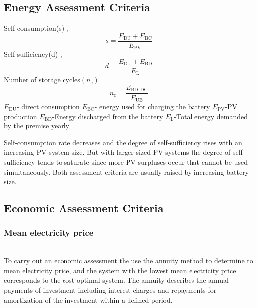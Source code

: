 \documentclass[sigconf,12pt,nonacm]{acmart}
\begin{document}
\subsection{Energy Assessment Criteria}
Self consumption(s) \cite{butzner_2017_der}, \cite{weniger_2014_sizing}
\begin{equation}\label{eq:1}s=\frac{E_{\mathrm{DU}}+E_{\mathrm{BC}}}{E_{\mathrm{PV}}}\end{equation}
Self sufficiency(d) \cite{butzner_2017_der}, \cite{weniger_2014_sizing}
\begin{equation}\label{eq:2}d=\frac{E_{\mathrm{DU}}+E_{\mathrm{BD}}}{E_{\mathrm{L}}}\end{equation}
Number of storage cycles$(n_{\mathrm{c}})$ \cite{weniger_2014_sizing}
\begin{equation}n_{\mathrm{c}}=\frac{E_{\mathrm{BD}, \mathrm{DC}}}{E_{\mathrm{UB}}}\end{equation}
$E_{\mathrm{DU}}$- direct consumption \newline
$E_{\mathrm{BC}}$- energy used  for  charging the battery \newline
$E_{\mathrm{PV}}$-PV production \newline
$E_{\mathrm{BD}}$-Energy discharged from the battery \newline
$E_{\mathrm{L}}$-Total energy demanded by the premise yearly \newline

Self-consumption rate decreases and the degree of self-sufficiency rises with an increasing PV system size. But with larger sized PV systems the degree of self-sufficiency tends to saturate since more PV surpluses occur that cannot be used simultaneously. Both assessment criteria are usually raised by increasing battery size.\citeauthor{quaschning_2013_optimale} \cite{quaschning_2013_optimale}

\subsection{Economic Assessment Criteria}
\subsubsection{Mean electricity price} 
\hfill\\
To carry out an economic assessment the \citeauthor{weniger_2014_sizing}\cite{weniger_2014_sizing} use the annuity method to determine to mean electricity price, and the system with the lowest mean electricity price corresponds to the cost-optimal system. The annuity describes the annual payments of investment including interest charges and repayments for amortization of the investment within a defined period.  \newline
\end{document}
